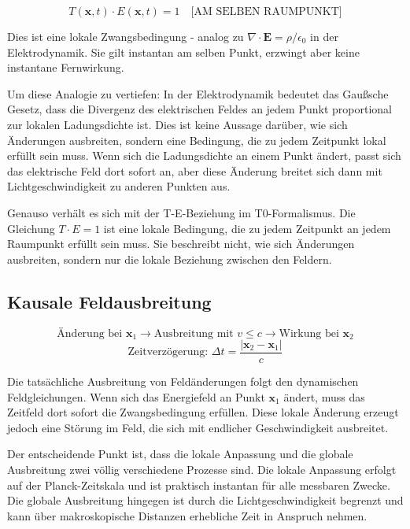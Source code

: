 	\begin{equation}
		T(\mathbf{x},t) \cdot E(\mathbf{x},t) = 1 \quad \text{[AM SELBEN RAUMPUNKT]} \label{eq:local_constraint}
	\end{equation}
	
	Dies ist eine lokale Zwangsbedingung - analog zu $\nabla \cdot \mathbf{E} = \rho/\epsilon_0$ in der Elektrodynamik. Sie gilt instantan am selben Punkt, erzwingt aber keine instantane Fernwirkung.
	
	Um diese Analogie zu vertiefen: In der Elektrodynamik bedeutet das Gaußsche Gesetz, dass die Divergenz des elektrischen Feldes an jedem Punkt proportional zur lokalen Ladungsdichte ist. Dies ist keine Aussage darüber, wie sich Änderungen ausbreiten, sondern eine Bedingung, die zu jedem Zeitpunkt lokal erfüllt sein muss. Wenn sich die Ladungsdichte an einem Punkt ändert, passt sich das elektrische Feld dort sofort an, aber diese Änderung breitet sich dann mit Lichtgeschwindigkeit zu anderen Punkten aus.
	
	Genauso verhält es sich mit der T-E-Beziehung im T0-Formalismus. Die Gleichung $T \cdot E = 1$ ist eine lokale Bedingung, die zu jedem Zeitpunkt an jedem Raumpunkt erfüllt sein muss. Sie beschreibt nicht, wie sich Änderungen ausbreiten, sondern nur die lokale Beziehung zwischen den Feldern.
	
	\subsection{Kausale Feldausbreitung}
	
	\begin{equation}
		\text{Änderung bei } \mathbf{x}_1 \rightarrow \text{Ausbreitung mit } v \leq c \rightarrow \text{Wirkung bei } \mathbf{x}_2
	\end{equation}
	\begin{equation}
		\text{Zeitverzögerung: } \Delta t = \frac{|\mathbf{x}_2 - \mathbf{x}_1|}{c} \label{eq:time_delay}
	\end{equation}
	
	Die tatsächliche Ausbreitung von Feldänderungen folgt den dynamischen Feldgleichungen. Wenn sich das Energiefeld an Punkt $\mathbf{x}_1$ ändert, muss das Zeitfeld dort sofort die Zwangsbedingung erfüllen. Diese lokale Änderung erzeugt jedoch eine Störung im Feld, die sich mit endlicher Geschwindigkeit ausbreitet.
	
	Der entscheidende Punkt ist, dass die lokale Anpassung und die globale Ausbreitung zwei völlig verschiedene Prozesse sind. Die lokale Anpassung erfolgt auf der Planck-Zeitskala und ist praktisch instantan für alle messbaren Zwecke. Die globale Ausbreitung hingegen ist durch die Lichtgeschwindigkeit begrenzt und kann über makroskopische Distanzen erhebliche Zeit in Anspruch nehmen.
	

